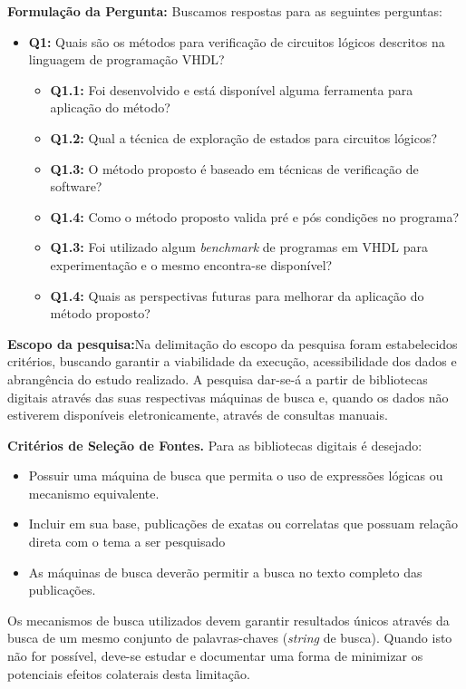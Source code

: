 \par
\textbf{Formulação da Pergunta:} Buscamos respostas para as seguintes perguntas:
\begin{itemize}
\item \textbf{Q1:} Quais são os métodos para verificação de circuitos lógicos descritos na linguagem de programação VHDL?
	\begin{itemize}
	\item \textbf{Q1.1:} Foi desenvolvido e está disponível alguma ferramenta para aplicação do método?
	\item \textbf{Q1.2:} Qual a técnica de exploração de estados para circuitos lógicos?
	\item \textbf{Q1.3:} O método proposto é baseado em técnicas de verificação de software?
	\item \textbf{Q1.4:} Como o método proposto valida pré e pós condições no programa?
	\item \textbf{Q1.3:} Foi utilizado algum \textit{benchmark} de programas em VHDL para experimentação e o mesmo encontra-se disponível?
	\item \textbf{Q1.4:} Quais as perspectivas futuras para melhorar da aplicação do método proposto?
	\end{itemize}
\end{itemize}

\par
\textbf{Escopo da pesquisa:}Na delimitação do escopo da pesquisa foram estabelecidos critérios, buscando garantir a viabilidade da execução, acessibilidade dos dados e abrangência do estudo realizado. A pesquisa dar-se-á a partir de bibliotecas digitais através das suas respectivas máquinas de busca e, quando os dados não estiverem disponíveis eletronicamente, através de consultas manuais.

\par
\textbf{Critérios de Seleção de Fontes.} Para as bibliotecas digitais é desejado:
\begin{itemize}
  \item Possuir uma máquina de busca que permita o uso de expressões lógicas ou mecanismo equivalente.
  \item Incluir em sua base, publicações de exatas ou correlatas que possuam relação direta com o tema a ser pesquisado
  \item As máquinas de busca deverão permitir a busca no texto completo das publicações.
\end{itemize}

Os mecanismos de busca utilizados devem garantir resultados únicos através da busca de um mesmo conjunto de palavras-chaves (\textit{string} de busca). Quando isto não for possível, deve-se estudar e documentar uma forma de minimizar os potenciais efeitos colaterais desta limitação.

